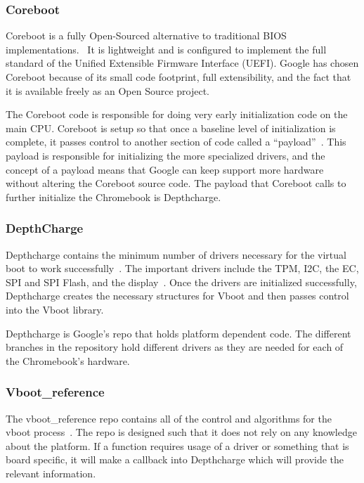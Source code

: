 \documentclass[../report.tex]{subfiles}
\begin{document}
\subsubsection{Coreboot}

Coreboot is a fully Open-Sourced alternative to traditional BIOS implementations.~\cite{coreboot}
It is lightweight and is configured to implement the full standard of the Unified Extensible Firmware Interface (UEFI).
Google has chosen Coreboot because of its small code footprint, full extensibility, and the fact that it is available freely as an Open Source project.

The Coreboot code is responsible for doing very early initialization code on the main CPU\@. 
Coreboot is setup so that once a baseline level of initialization is complete, it passes control to another section of code called a ``payload''~\cite{coreboot-payload}.
This payload is responsible for initializing the more specialized drivers, and the concept of a payload means that Google can keep support more hardware without altering the Coreboot source code.
The payload that Coreboot calls to further initialize the Chromebook is Depthcharge.


\subsubsection{DepthCharge}

Depthcharge contains the minimum number of drivers necessary for the virtual boot to work successfully~\cite{depthcharge-codebase}. 
The important drivers include the TPM, I2C, the EC, SPI and SPI Flash, and the display~\cite{depthcharge-slides}.
Once the drivers are initialized successfully, Depthcharge creates the necessary structures for Vboot and then passes control into the Vboot library.

Depthcharge is Google's repo that holds platform dependent code.
The different branches in the repository hold different drivers as they are needed for each of the Chromebook's hardware.

\subsubsection{Vboot\_reference}

The vboot\_reference repo contains all of the control and algorithms for the vboot process~\cite{vboot-codebase}.
The repo is designed such that it does not rely on any knowledge about the platform.
If a function requires usage of a driver or something that is board specific, it will make a callback into Depthcharge which will provide the relevant information.
\end{document}
